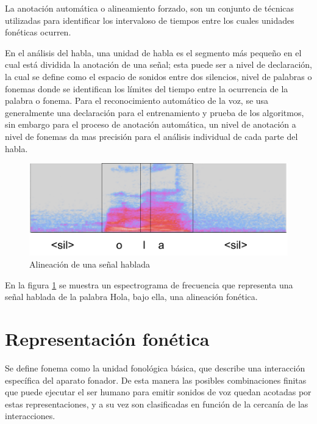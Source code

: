 La anotación automática o alineamiento forzado, son un conjunto de técnicas utilizadas para identificar los intervaloso de tiempos entre los cuales unidades fonéticas ocurren.

En el análisis del habla, una unidad de habla es el segmento más pequeño en el cual está dividida la anotación de una señal; esta puede ser a nivel de declaración, la cual se define como el espacio de sonidos entre dos silencios, nivel de palabras o fonemas donde se identifican los límites del tiempo entre la ocurrencia de la palabra o fonema. Para el reconocimiento automático de la voz, se usa generalmente una declaración para el entrenamiento y prueba de los algoritmos, sin embargo para el proceso de anotación automática, un nivel de anotación a nivel de fonemas da mas precisión para el análisis individual de cada parte del habla.

\begin{figure}[H]

\centering
\caption{Alineación de una señal hablada}
\label{img:alignment}
\includegraphics[scale=0.50]{imagenes/alignment.png}
\end{figure}

En la figura \ref{img:alignment} se muestra un espectrograma de frecuencia que representa una señal hablada de la palabra Hola, bajo ella, una alineación fonética.

\section{Representación fonética}

Se define fonema como la unidad fonológica básica, que describe una interacción específica del aparato fonador. De esta manera las posibles combinaciones finitas que puede ejecutar el ser humano para emitir sonidos de voz quedan acotadas por estas representaciones, y a su vez son clasificadas en función de la cercanía de las interacciones.

